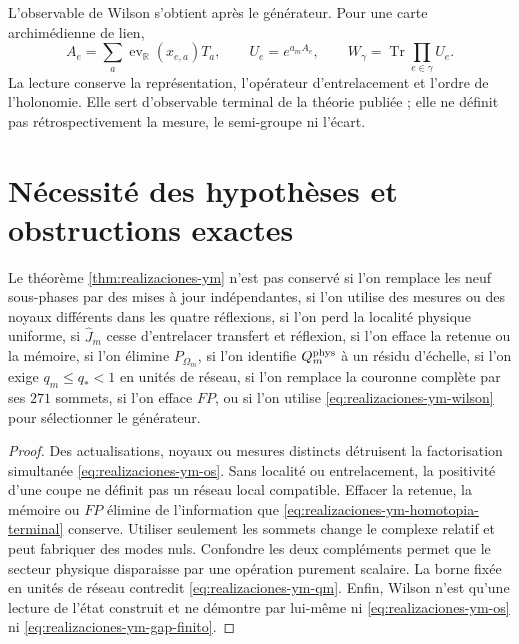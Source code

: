 L’observable de Wilson s’obtient après le générateur. Pour une carte
archimédienne de lien,
\begin{equation}\label{eq:realizaciones-ym-wilson}
 A_e=\sum_a\operatorname{ev}_{\mathbb R}(x_{e,a})T_a,
 \qquad
 U_e=e^{a_mA_e},
 \qquad
 W_\gamma=\operatorname{Tr}\!\prod_{e\in\gamma}U_e.
\end{equation}
La lecture conserve la représentation, l’opérateur d’entrelacement et
l’ordre de l’holonomie. Elle sert d’observable terminal de la théorie publiée ; elle ne définit pas
rétrospectivement la mesure, le semi-groupe ni l’écart.

\section*{Nécessité des hypothèses et obstructions exactes}

\begin{ablation}
\label{abl:realizaciones-ym}
Le théorème \ref{thm:realizaciones-ym} n’est pas conservé si l’on remplace les
neuf sous-phases par des mises à jour indépendantes, si l’on utilise des mesures ou
des noyaux différents dans les quatre réflexions, si l’on perd la localité physique
uniforme, si \(\widehat J_m\) cesse d’entrelacer transfert et réflexion, si l’on
efface la retenue ou la mémoire, si l’on élimine \(P_{\Omega_m}\), si l’on identifie
\(Q_m^{\rm phys}\) à un résidu d’échelle, si l’on exige
\(q_m\leq q_*<1\) en unités de réseau, si l’on remplace la couronne complète
par ses \(271\) sommets, si l’on efface \(FP\), ou si l’on utilise
\eqref{eq:realizaciones-ym-wilson} pour sélectionner le générateur.
\end{ablation}

\begin{proof}
Des actualisations, noyaux ou mesures distincts détruisent la factorisation
simultanée \eqref{eq:realizaciones-ym-os}. Sans localité ou entrelacement,
la positivité d’une coupe ne définit pas un réseau local compatible. Effacer la retenue,
la mémoire ou \(FP\) élimine de l’information que
\eqref{eq:realizaciones-ym-homotopia-terminal} conserve. Utiliser seulement les
sommets change le complexe relatif et peut fabriquer des modes nuls. Confondre
les deux compléments permet que le secteur physique disparaisse par une
opération purement scalaire. La borne fixée en unités de réseau contredit
\eqref{eq:realizaciones-ym-qm}. Enfin, Wilson n’est qu’une lecture de
l’état construit et ne démontre par lui-même ni
\eqref{eq:realizaciones-ym-os} ni
\eqref{eq:realizaciones-ym-gap-finito}.
\end{proof}

